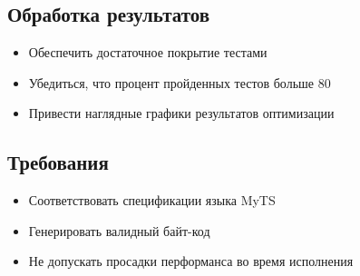 \subsection{Обработка результатов}

\begin{itemize}[left=2em]
    \item Обеспечить достаточное покрытие тестами
    \item Убедиться, что процент пройденных тестов больше 80
    \item Привести наглядные графики результатов оптимизации
\end{itemize}

\subsection{Требования}

\begin{itemize}[left=2em]
    \item Соответствовать спецификации языка MyTS
    \item Генерировать валидный байт-код
    \item Не допускать просадки перформанса во время исполнения
\end{itemize}

\newpage
